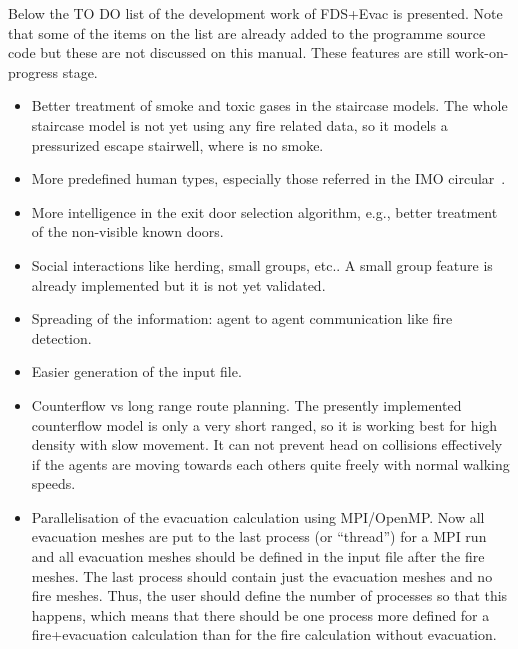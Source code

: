 \documentclass[12pt,a4paper,final,twoside]{stylevk}
\begin{document}
Below the TO DO list of the development work of FDS+Evac is
presented.  Note that some of the items on the list are already added
to the programme source code but these are not discussed on this
manual.  These features are still work-on-progress stage.
%
\begin{itemize}
%
\item Better treatment of smoke and toxic gases in the staircase
  models.  The whole staircase model is not yet using any fire related
  data, so it models a pressurized escape stairwell, where is no
  smoke.
%
\item More predefined human types, especially those referred in the
  IMO circular~\cite{IMO07}.
%
\item More intelligence in the exit door selection algorithm,
  e.g., better treatment of the non-visible known doors.
%
\item Social interactions like herding, small groups, etc..  A
  small group feature is already implemented but it is not yet validated.
%
\item Spreading of the information: agent to agent communication like
  fire detection.
%
\item Easier generation of the input file.
%
\item Counterflow vs long range route planning.  The presently
  implemented counterflow model is only a very short ranged, so it is
  working best for high density with slow movement.  It can not
  prevent head on collisions effectively if the agents are moving
  towards each others quite freely with normal walking speeds.
%
\item Parallelisation of the evacuation calculation using MPI/OpenMP.
  Now all evacuation meshes are put to the last process (or
  ``thread'') for a MPI run and all evacuation meshes should be
  defined in the input file after the fire meshes.  The last process
  should contain just the evacuation meshes and no fire meshes.  Thus,
  the user should define the number of processes so that this happens,
  which means that there should be one process more defined for a
  fire+evacuation calculation than for the fire calculation without
  evacuation.
%
\end{itemize}
%
\end{document}

